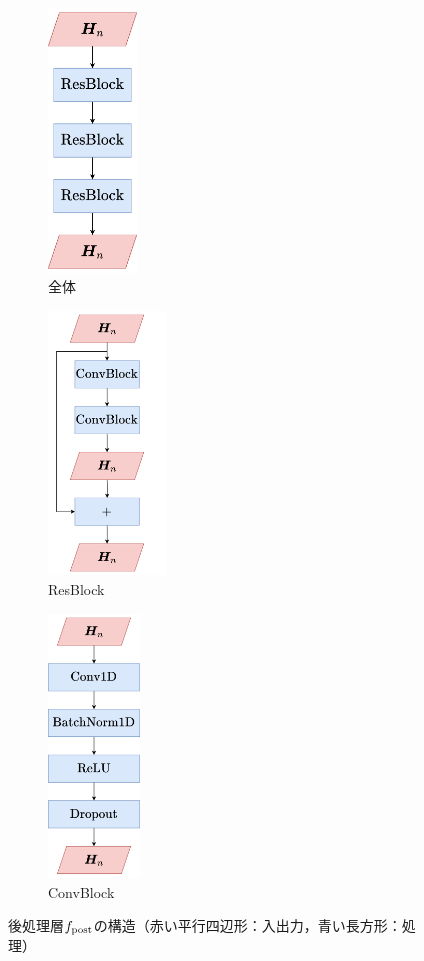\begin{figure}[tb]
    \centering
    \begin{subfigure}[b]{0.32\textwidth}
        \centering
        \includegraphics[height=70mm]{./figure/sec4/model_2/post.drawio.png}
        \caption{全体}
        \label{sec4:fig:post}
    \end{subfigure}
    \hfill
    \begin{subfigure}[b]{0.32\textwidth}
        \centering
        \includegraphics[height=70mm]{./figure/sec4/model_2/post_resblock.drawio.png}
        \caption{ResBlock}
        \label{sec4:fig:post_resblock}
    \end{subfigure}
    \hfill
    \begin{subfigure}[b]{0.32\textwidth}
        \centering
        \includegraphics[height=70mm]{./figure/sec4/model_2/post_convblock.drawio.png}
        \caption{ConvBlock}
        \label{sec4:fig:post_convblock}
    \end{subfigure}
    \caption{後処理層$f_{\text{post}}$の構造（赤い平行四辺形：入出力，青い長方形：処理）}
    \label{sec4:fig:post_three_step}
\end{figure}

